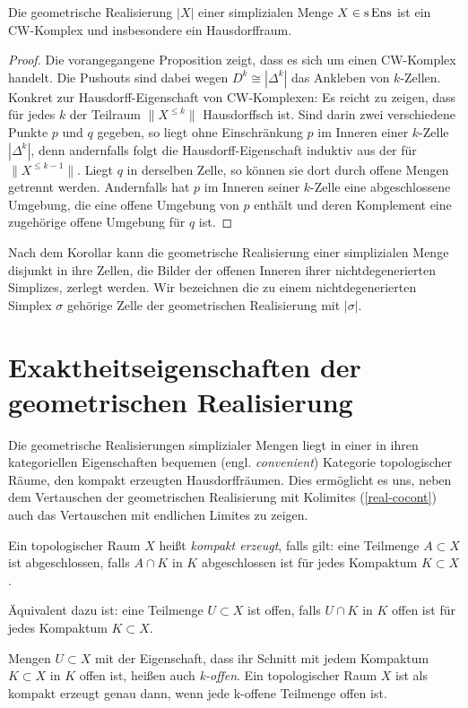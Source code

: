 \begin{kor} \label{real-hd}
  Die geometrische Realisierung $|X|$ einer simplizialen Menge $X \in
  \operatorname{s}\operatorname{Ens}$ ist ein CW-Komplex und insbesondere ein Hausdorffraum.
\end{kor}
\begin{proof}
  Die vorangegangene Proposition zeigt, dass es sich um einen
  CW-Komplex handelt. Die Pushouts sind dabei wegen $D^k \cong
  |\Delta^k|$ das Ankleben von $k$-Zellen. Konkret zur
  Hausdorff-Eigenschaft von CW-Komplexen: Es reicht zu zeigen, dass
  für jedes $k$ der Teilraum $\|X^{\leq k}\|$ Hausdorffsch ist. Sind
  darin zwei verschiedene Punkte $p$ und $q$ gegeben, so liegt ohne
  Einschränkung $p$ im Inneren einer $k$-Zelle $|\Delta^k|$, denn
  andernfalls folgt die Hausdorff-Eigenschaft induktiv aus der für
  $\|X^{\leq k-1}\|$. Liegt $q$ in derselben Zelle, so können sie dort
  durch offene Mengen getrennt werden. Andernfalls hat $p$ im Inneren
  seiner $k$-Zelle eine abgeschlossene Umgebung, die eine offene
  Umgebung von $p$ enthält und deren Komplement eine zugehörige offene
  Umgebung für $q$ ist.
\end{proof}
\begin{bem} \label{cw-cells}
  Nach dem Korollar kann die geometrische Realisierung einer
  simplizialen Menge disjunkt in ihre Zellen, die Bilder der offenen
  Inneren ihrer nichtdegenerierten Simplizes, zerlegt werden. Wir
  bezeichnen die zu einem nichtdegenerierten Simplex $\sigma$ gehörige
  Zelle der geometrischen Realisierung mit $|\sigma|$.
\end{bem}

\section[Exaktheitseigenschaften der geometrischen Realisierung]
        {Exaktheitseigenschaften der geometrischen Realisierung
        }

Die geometrische Realisierungen simplizialer Mengen liegt in einer in
ihren kategoriellen Eigenschaften bequemen (engl. \emph{convenient})
Kategorie topologischer Räume, den kompakt erzeugten
Hausdorffräumen. Dies ermöglicht es uns, neben dem Vertauschen der
geometrischen Realisierung mit Kolimites (\ref{real-cocont}) auch das
Vertauschen mit endlichen Limites zu zeigen.

\begin{defn} \label{def:cg}
  Ein topologischer Raum $X$ heißt \emph{kompakt erzeugt}, falls gilt:
  eine Teilmenge $A \subset X$ ist abgeschlossen, falls $A \cap K$ in
  $K$ abgeschlossen ist für jedes Kompaktum $K \subset X$.
\end{defn}
\begin{bem}
  Äquivalent dazu ist: eine Teilmenge $U \subset X$ ist offen, falls
  $U \cap K$ in $K$ offen ist für jedes Kompaktum $K \subset X$.
\end{bem}
Mengen $U \subset X$ mit der Eigenschaft, dass ihr Schnitt mit jedem
Kompaktum $K \subset X$ in $K$ offen ist, heißen auch
\emph{k-offen}. Ein topologischer Raum $X$ ist als kompakt erzeugt
genau dann, wenn jede k-offene Teilmenge offen ist.

